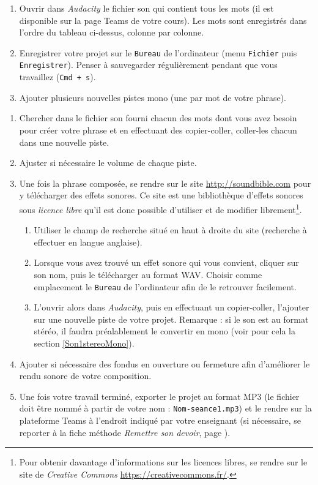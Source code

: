 {\begin{enumerate}
\item Ouvrir dans \emph{Audacity} le fichier son qui contient tous les mots (il est disponible sur la page Teams de votre cours). Les mots sont enregistrés dans l'ordre du tableau ci-dessus, colonne par colonne.
\item Enregistrer votre projet sur le \texttt{Bureau} de l'ordinateur (menu \texttt{Fichier} puis \texttt{Enregistrer}). Penser à sauvegarder régulièrement pendant que vous travaillez (\texttt{Cmd + s}).   
\item Ajouter plusieurs nouvelles pistes mono (une par mot de votre phrase). 
\setcounter{tmp}{\value{enumi}}  
\end{enumerate}
\begin{enumerate}
\setcounter{enumi}{\value{tmp}}
\item Chercher dans le fichier son fourni chacun des mots dont vous avez besoin pour créer votre phrase et en effectuant des copier-coller, coller-les chacun dans une nouvelle piste.
\item Ajuster si nécessaire le volume de chaque piste.
\item Une fois la phrase composée, se rendre sur le site \url{http://soundbible.com} pour y télécharger des effets sonores. Ce site est une bibliothèque d'effets sonores sous \emph{licence libre} qu'il est donc possible d'utiliser et de modifier librement\footnote{Pour obtenir davantage d'informations sur les licences libres, se rendre sur le site de \emph{Creative Commons} \url{https://creativecommons.fr/}.}.
        \begin{enumerate}
        \item Utiliser le champ de recherche situé en haut à droite du site (recherche à effectuer en langue anglaise).
        \item Lorsque vous avez trouvé un effet sonore qui vous convient, cliquer sur son nom, puis le télécharger au format WAV. Choisir comme emplacement le \texttt{Bureau} de l'ordinateur afin de le retrouver facilement.
        \item L'ouvrir alors dans \emph{Audacity}, puis en effectuant un copier-coller, l'ajouter sur une nouvelle piste de votre projet. Remarque : si le son est au format stéréo, il faudra préalablement le convertir en mono (voir pour cela la section \vref{Son1stereoMono}). 
        \end{enumerate}
\item Ajouter si nécessaire des fondus en ouverture ou fermeture afin d'améliorer le rendu sonore de votre composition.
\item Une fois votre travail terminé, exporter le projet au format MP3 (le fichier doit être nommé à partir de votre nom : \texttt{Nom-seance1.mp3}) et le rendre sur la plateforme Teams à l'endroit indiqué par votre enseignant (si nécessaire, se reporter à la fiche méthode \emph{Remettre son devoir}, page \pageref{TeamsRemettreDevoir}). 
\end{enumerate}

}%

